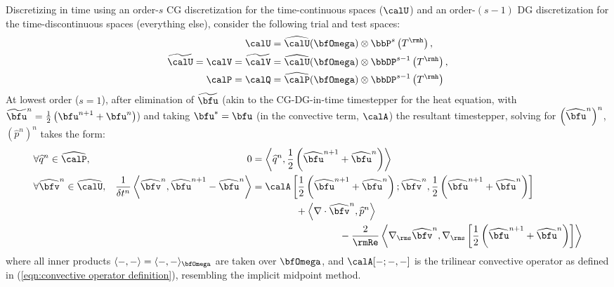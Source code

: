     \begin{example}
        Discretizing in time using an order-$s$ CG discretization for the time-continuous spaces ($\calU$) and an order-$(s - 1)$ DG discretization for the time-discontinuous spaces (everything else), consider the following trial and test spaces:
        \begin{align}
            \calU  &=  \widehat{\calU}(\bfOmega)\otimes\bbP^{s}\left(T^{\rmh}\right),  \\
            \widetilde{\calU}  =  \calV  =  \widetilde{\calV}  &=  \widehat{\calU}(\bfOmega)\otimes\bbDP^{s - 1}\left(T^{\rmh}\right),  \\
            \calP  =  \calQ  &=  \widehat{\calP}(\bfOmega)\otimes\bbDP^{s - 1}\left(T^{\rmh}\right)
        \end{align}
        At lowest order ($s = 1$), after elimination of $\widetilde{\bfu}$ (akin to the CG-DG-in-time timestepper for the heat equation, with $\widetilde{\bfu}^{n}  =  \frac{1}{2}\left(\bfu^{n + 1} + \bfu^{n}\right)$) and taking $\bfu^{*} = \bfu$ (in the convective term, $\calA$) the resultant timestepper, solving for $\left(\widehat{\bfu}^{n}\right)^{n}$, $\left(\widehat{p}^{n}\right)^{n}$ takes the form:
        \begin{align*}
            &\forall  \widehat{q}^{n}     \in  \widehat{\calP},  &                                                                                                               0  &=  \left\langle \widehat{q}^{n}, \frac{1}{2}\left(\widehat{\bfu}^{n + 1} + \widehat{\bfu}^{n}\right)\right\rangle  \\
            &\forall  \widehat{\bfv}^{n}  \in  \widehat{\calU},  &  \frac{1}{\delta t^{n}}\left\langle\widehat{\bfv}^{n}, \widehat{\bfu}^{n + 1} - \widehat{\bfu}^{n}\right\rangle  &=  \calA\left[\frac{1}{2}\left(\widehat{\bfu}^{n + 1} + \widehat{\bfu}^{n}\right); \widehat{\bfv}^{n}, \frac{1}{2}\left(\widehat{\bfu}^{n + 1} + \widehat{\bfu}^{n}\right)\right]  \\
            &                                                    &                                                                                                                  &\;\;\;\;\;\;\;\;\;\;\;\;\;\;\;\;  + \left\langle\nabla\cdot\widehat{\bfv}^{n}, \widehat{p}^{n}\right\rangle  \\
            &                                                    &                                                                                                                  &\;\;\;\;\;\;\;\;\;\;\;\;\;\;\;\;\;\;\;\;\;\;\;\;\;\;\;\;\;\;\;\;  - \frac{2}{\rmRe}\left\langle\nabla_{\rms}\widehat{\bfv}^{n}, \nabla_{\rms}\left[\frac{1}{2}\left(\widehat{\bfu}^{n + 1} + \widehat{\bfu}^{n}\right)\right]\right\rangle
        \end{align*}
        where all inner products $\langle -, -\rangle  =  \langle -, -\rangle_{\bfOmega}$ are taken over $\bfOmega$, and $\calA[-; -, -]$ is the trilinear convective operator as defined in (\ref{eqn:convective operator definition}), resembling the implicit midpoint method.


\end{example}

